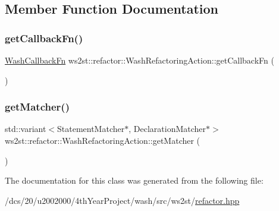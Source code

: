 \subsection{Member Function Documentation}
\mbox{\label{classws2st_1_1refactor_1_1WashRefactoringAction_aaf97a9edbe147cb2d5697d28c5485924}} 
\subsubsection{\texorpdfstring{get\+Callback\+Fn()}{getCallbackFn()}}
{\footnotesize\ttfamily \mbox{\hyperlink{namespacews2st_a682dfda40d8282c7e579a7b826a7d861}{Wash\+Callback\+Fn}} ws2st\+::refactor\+::\+Wash\+Refactoring\+Action\+::get\+Callback\+Fn (\begin{DoxyParamCaption}{ }\end{DoxyParamCaption})\hspace{0.3cm}{\ttfamily [inline]}}

\mbox{\label{classws2st_1_1refactor_1_1WashRefactoringAction_a22a440b7927da3ab1561a9292b9ee0d6}} 
\subsubsection{\texorpdfstring{get\+Matcher()}{getMatcher()}}
{\footnotesize\ttfamily std\+::variant$<$Statement\+Matcher$\ast$, Declaration\+Matcher$\ast$$>$ ws2st\+::refactor\+::\+Wash\+Refactoring\+Action\+::get\+Matcher (\begin{DoxyParamCaption}{ }\end{DoxyParamCaption})\hspace{0.3cm}{\ttfamily [inline]}}



The documentation for this class was generated from the following file\+:\begin{DoxyCompactItemize}
\item 
/dcs/20/u2002000/4th\+Year\+Project/wash/src/ws2st/\mbox{\hyperlink{refactor_8hpp}{refactor.\+hpp}}\end{DoxyCompactItemize}
